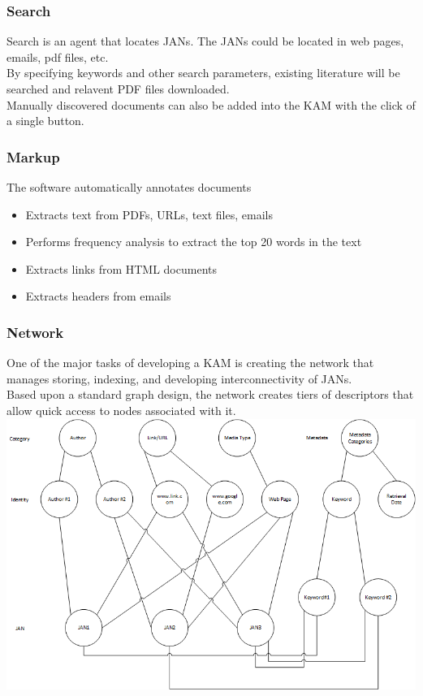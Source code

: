 \documentclass{beamer}
\begin{document}
  \begin{frame}
    \frametitle{Search}
    Search is an agent that locates JANs.  The JANs could be located in web pages, emails, pdf files, etc.\\
    \medskip
    By specifying keywords and other search parameters, existing literature will be searched and relavent PDF files downloaded.\\
    \medskip
    Manually discovered documents can also be added into the KAM with the click of a single button.
  \end{frame}
  \begin{frame}
    \frametitle{Markup}
    The software automatically annotates documents\\
    \begin{itemize}
    \item{Extracts text from PDFs, URLs, text files, emails}
    \item{Performs frequency analysis to extract the top 20 words in the text}
    \item{Extracts links from HTML documents}
    \item{Extracts headers from emails}
    \end{itemize}
  \end{frame}
  \begin{frame}
    \frametitle{Network}
    One of the major tasks of developing a KAM is creating the network that manages storing, indexing, and developing interconnectivity of JANs.\\
    \medskip
    Based upon a standard graph design, the network creates tiers of descriptors that allow quick access to nodes associated with it.\\
    \medskip
    \centering
    \includegraphics[width=0.5\linewidth]{Network}
  \end{frame}
\end{document}
